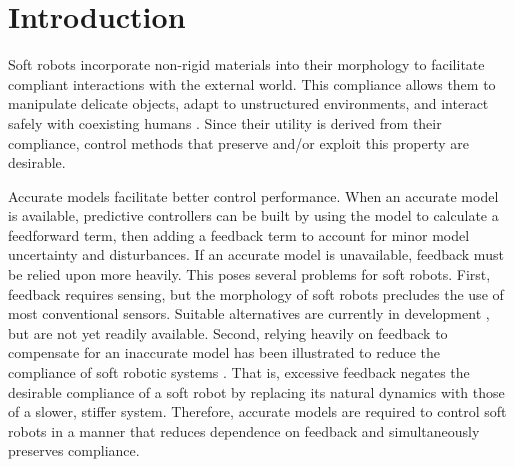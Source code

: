 \section{Introduction}
\label{sec:intro}

Soft robots incorporate non-rigid materials into their morphology to facilitate compliant interactions with the external world.
This compliance allows them to manipulate delicate objects, adapt to unstructured environments, and interact safely with coexisting humans 
\cite{rus2015design, majidi2014soft, lipson2014challenges}.
Since their utility is derived from their compliance, control methods that preserve and/or exploit this property are desirable. 

Accurate models facilitate better control performance.
When an accurate model is available, predictive controllers can be built by using the model to calculate a feedforward term, then adding a feedback term to account for minor model uncertainty and disturbances.
If an accurate model is unavailable, feedback must be relied upon more heavily.
This poses several problems for soft robots.
First, feedback requires sensing, but the morphology of soft robots precludes the use of most conventional sensors.
Suitable alternatives are currently in development \cite{felt2018modeling, felt2017inductance, yang2013gauge, kim2011epidermal}, but are not yet readily available.
Second, relying heavily on feedback to compensate for an inaccurate model has been illustrated to reduce the compliance of soft robotic systems \cite{della2017controlling}.
That is, excessive feedback negates the desirable compliance of a soft robot by replacing its natural dynamics with those of a slower, stiffer system.
Therefore, accurate models are required to control soft robots in a manner that reduces dependence on feedback and simultaneously preserves compliance.


